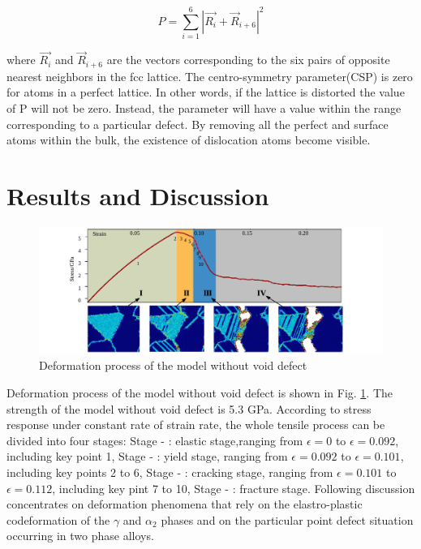 \documentclass[metals,article,submit,moreauthors,pdftex,10pt,a4paper]{Definitions/mdpi}
\begin{document}
	\begin{equation} \label{eq:csp} 
	P = \displaystyle\sum_{i=1}^{6}|\vec{R_i}+{\vec{R}}_{i+6}|^2
	\end{equation}
	
where $\vec{R_i}$ and ${\vec{R}}_{i+6}$ are the vectors corresponding to the six pairs of opposite nearest neighbors in the fcc lattice. The centro-symmetry parameter(CSP) is zero for atoms in a perfect lattice. In other words, if the lattice is distorted the value of P will not be zero. Instead, the parameter will have a value within the range corresponding to a particular defect. By removing all the perfect and surface atoms within the bulk, the existence of dislocation atoms become visible. 
 
\section{Results and Discussion}\label{section:RD}

\begin{figure}[ht]
	\centering
	\includegraphics[width=1\linewidth]{img/tens}
	\caption{Deformation process of the model without void defect}
	\label{fig:deformation-pf}
\end{figure}


Deformation process of the model without void defect is shown in Fig. \ref{fig:deformation-pf}. The strength of the model without void defect is 5.3 GPa. According to stress response under constant rate of strain rate, the whole tensile process can be divided into four stages: 
Stage - \uppercase\expandafter{}: elastic stage,ranging from $\epsilon = 0$ to $\epsilon = 0.092$, including key point 1,
Stage - \uppercase\expandafter{}: yield stage, ranging from $\epsilon = 0.092$ to $\epsilon = 0.101$, including key points 2 to 6,
Stage - \uppercase\expandafter{}: cracking stage, ranging from $\epsilon = 0.101$ to $\epsilon = 0.112$, including key pint 7 to 10,
Stage - \uppercase\expandafter{}: fracture stage. Following discussion concentrates on deformation phenomena that rely on the elastro-plastic codeformation of the $\gamma$ and $\alpha_2$ phases and on the particular point defect situation occurring in two phase alloys. 
\end{document}
